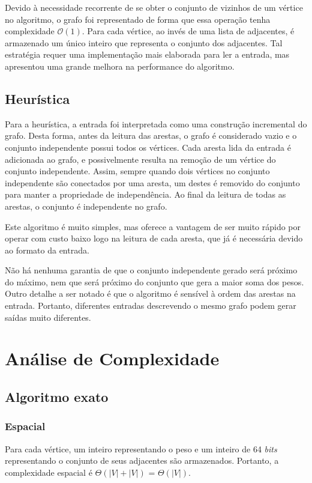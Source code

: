 \documentclass{article}
\begin{document}
Devido à necessidade recorrente de se obter o conjunto de vizinhos de um vértice no algoritmo, o grafo foi representado de forma que essa operação tenha complexidade $\mathcal{O}(1)$. Para cada vértice, ao invés de uma lista de adjacentes, é armazenado um único inteiro que representa o conjunto dos adjacentes. Tal estratégia requer uma implementação mais elaborada para ler a entrada, mas apresentou uma grande melhora na performance do algoritmo.


\pagebreak


\subsection{Heurística}
Para a heurística, a entrada foi interpretada como uma construção incremental do grafo. Desta forma, antes da leitura das arestas, o grafo é considerado vazio e o conjunto independente possui todos os vértices. Cada aresta lida da entrada é adicionada ao grafo, e possivelmente resulta na remoção de um vértice do conjunto independente. Assim, sempre quando dois vértices no conjunto independente são conectados por uma aresta, um destes é removido do conjunto para manter a propriedade de independência. Ao final da leitura de todas as arestas, o conjunto é independente no grafo.

Este algoritmo é muito simples, mas oferece a vantagem de ser muito rápido por operar com custo baixo logo na leitura de cada aresta, que já é necessária devido ao formato da entrada.

Não há nenhuma garantia de que o conjunto independente gerado será próximo do máximo, nem que será próximo do conjunto que gera a maior soma dos pesos. Outro detalhe a ser notado é que o algoritmo é sensível à ordem das arestas na entrada. Portanto, diferentes entradas descrevendo o mesmo grafo podem gerar saídas muito diferentes.

\section{Análise de Complexidade}

\subsection{Algoritmo exato}
\subsubsection{Espacial}
Para cada vértice, um inteiro representando o peso e um inteiro de 64 \textit{bits} representando o conjunto de seus adjacentes são armazenados. Portanto, a complexidade espacial é $\Theta(|V| + |V|)$ = $\Theta(|V|)$.
\end{document}
